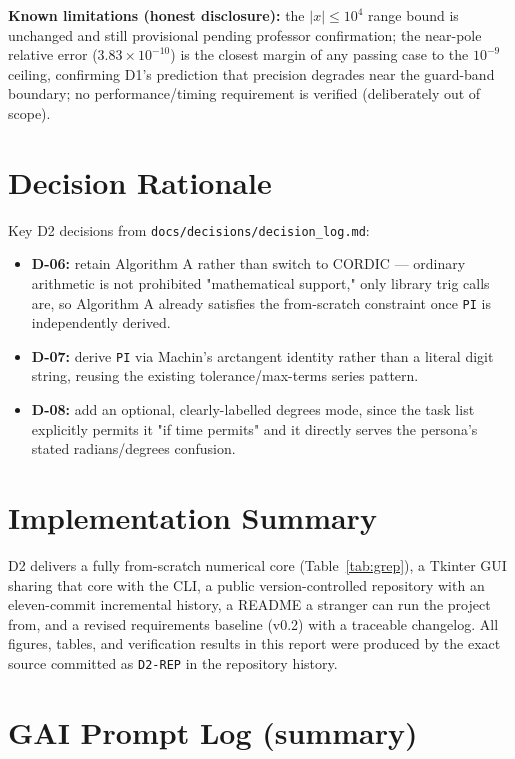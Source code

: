 \documentclass[11pt]{article}
\begin{document}
\textbf{Known limitations (honest disclosure):} the $|x|\le10^4$ range bound is unchanged and still provisional pending professor confirmation; the near-pole relative error ($3.83\times10^{-10}$) is the closest margin of any passing case to the $10^{-9}$ ceiling, confirming D1's prediction that precision degrades near the guard-band boundary; no performance/timing requirement is verified (deliberately out of scope).

\section{Decision Rationale}

Key D2 decisions from \texttt{docs/decisions/decision\_log.md}:
\begin{itemize}
  \item \textbf{D-06:} retain Algorithm A rather than switch to CORDIC --- ordinary arithmetic is not prohibited "mathematical support," only library trig calls are, so Algorithm A already satisfies the from-scratch constraint once \texttt{PI} is independently derived.
  \item \textbf{D-07:} derive \texttt{PI} via Machin's arctangent identity rather than a literal digit string, reusing the existing tolerance/max-terms series pattern.
  \item \textbf{D-08:} add an optional, clearly-labelled degrees mode, since the task list explicitly permits it "if time permits" and it directly serves the persona's stated radians/degrees confusion.
\end{itemize}

\section{Implementation Summary}

D2 delivers a fully from-scratch numerical core (Table~\ref{tab:grep}), a Tkinter GUI sharing that core with the CLI, a public version-controlled repository with an eleven-commit incremental history, a README a stranger can run the project from, and a revised requirements baseline (v0.2) with a traceable changelog. All figures, tables, and verification results in this report were produced by the exact source committed as \texttt{D2-REP} in the repository history.

\appendix
\section{GAI Prompt Log (summary)}
\label{sec:gai-log}
\end{document}
